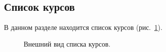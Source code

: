 \subsection{Список курсов}
\label{course:subsec:course_list}
В данном разделе находится список курсов (рис.~\ref{img:course:course_list}).

\begin{figure}[H]
	\caption{Внешний вид списка курсов.}
	\label{img:course:course_list}
\end{figure}

